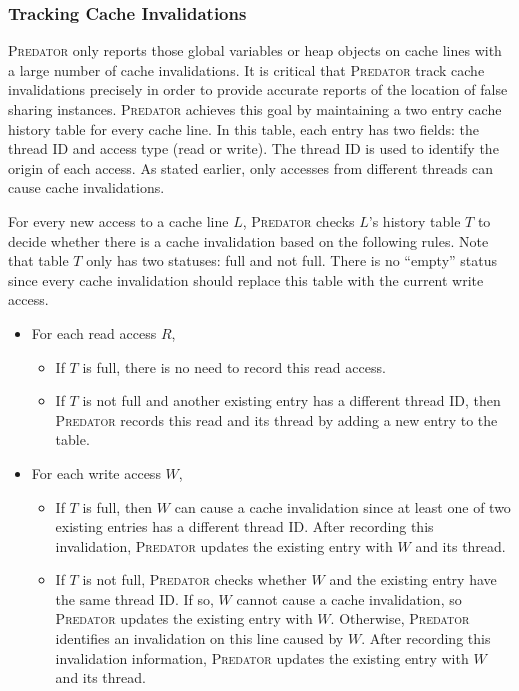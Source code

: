 \documentclass[10pt]{sigplanconf}
\newcommand{\Predator}{{\scshape Predator}}
\begin{document}
\subsubsection{Tracking Cache Invalidations}
\Predator{} only reports those global variables or heap objects on cache lines with a large number of cache invalidations. It is critical that \Predator{} track cache invalidations precisely in order to provide accurate reports of the location of false sharing instances.
\Predator{} achieves this goal by maintaining a two entry cache history table for every cache line.  In this table,
each entry has two fields: the thread ID and access type (read or write). The thread ID is used to identify the origin of each access. As stated earlier, only accesses from different threads can cause cache invalidations.

For every new access to a cache line $L$, \Predator{} checks $L$'s history table $T$ to decide whether there is a cache invalidation based on the following rules.  Note that table $T$ only has two statuses: full and not full.  There is no ``empty'' status since every cache invalidation should replace this table with the current write access.

\begin{itemize}
\item
For each read access $R$, 
\begin{itemize}
\item
If $T$ is full, there is no need to record this read access.
\item
If $T$ is not full and another existing entry has a different thread
ID, then \Predator{} records this read and its thread by adding a new entry to the table. 
\end{itemize}
\item
For each write access $W$, 
\begin{itemize}
\item
If $T$ is full, then $W$ can cause a cache invalidation since at least one of two existing entries has a different thread ID.
After recording this invalidation, \Predator{} updates the
existing entry with $W$ and its thread.
\item
If $T$ is not full,
\Predator{} checks whether $W$ and the existing entry have the same thread ID. If
so, $W$ cannot cause a cache invalidation, so \Predator{} updates the existing
entry with $W$. Otherwise, \Predator{} identifies an invalidation on this line caused by $W$. 
After recording this invalidation information, \Predator{} updates the
existing entry with $W$ and its thread.
\end{itemize}
\end{itemize}
\end{document}
